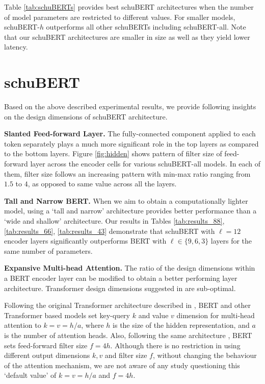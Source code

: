 \documentclass[11pt,a4paper]{article}
\begin{document}
Table \ref{tab:schuBERTs} provides best schuBERT architectures when the number of model parameters are restricted to different values. For smaller models, schuBERT-$h$ outperforms all other schuBERTs including schuBERT-all. Note that our schuBERT architectures are smaller in size as well as they yield lower latency. 

\section{schuBERT}
Based on the above described experimental results, we provide following insights on the design dimensions of schuBERT architecture. 

\textbf{Slanted Feed-forward Layer.} The fully-connected component applied to each token separately plays a much more significant role in the top layers as compared to the bottom layers. Figure \ref{fig:hidden} shows pattern of filter size of feed-forward layer across the encoder cells for various schuBERT-all models. In each of them, filter size follows an increasing pattern with min-max ratio ranging from $1.5$ to $4$, as opposed to same value across all the layers.

\textbf{Tall and Narrow BERT.} When we aim to obtain a computationally lighter model, using a `tall and narrow' architecture provides better performance than a `wide and shallow' architecture. Our results in Tables \ref{tab:results_88}, \ref{tab:results_66}, \ref{tab:results_43} demonstrate that schuBERT with $\ell=12$ encoder layers significantly outperforms BERT with $\ell \in \{9,6,3\}$ layers for the same number of parameters.

\textbf{Expansive Multi-head Attention.} The ratio of the design dimensions within a BERT encoder layer can be modified to obtain a better performing layer architecture. Transformer design dimensions suggested in \citep{vaswani2017attention} are sub-optimal. 

Following the original Transformer architecture described in \citep{vaswani2017attention}, BERT and other Transformer based models set key-query $k$ and value $v$ dimension for multi-head attention to $k=v=h/a$, where $h$ is the size of the hidden representation, and $a$ is the number of attention heads. Also, following the same architecture \citep{vaswani2017attention}, BERT sets feed-forward filter size $f=4h$. Although there is no restriction in using different output dimensions $k, v$ and filter size $f$, without changing the behaviour of the attention mechanism, we are not aware of any study questioning this `default value' of $k=v=h/a$ and $f=4h$. 
\end{document}
